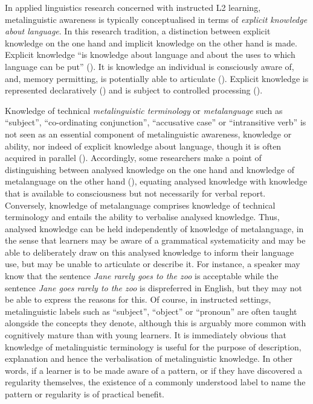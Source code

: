 \documentclass[output=paper]{langscibook}
\begin{document}
In applied linguistics research concerned with instructed L2 learning, metalinguistic awareness is typically conceptualised in terms of \textit{explicit knowledge about language}. In this research tradition, a distinction between explicit knowledge on the one hand and implicit knowledge on the other hand is made. Explicit knowledge “is knowledge about language and about the uses to which language can be put” (\citealt[229]{Ellis2004}). It is knowledge an individual is consciously aware of, and, memory permitting, is potentially able to articulate (\citealt{Ellis2004}). Explicit knowledge is represented declaratively (\citealt{Hulstijn2005}) and is subject to controlled processing (\citealt{EllisEtAl2009}).

Knowledge of technical \textit{metalinguistic terminology} or \textit{metalanguage} such as ``subject'', ``co-ordinating conjunction'', ``accusative case'' or ``intransitive verb'' is not seen as an essential component of metalinguistic awareness, knowledge or ability, nor indeed of explicit knowledge about language, though it is often acquired in parallel (\citealt{Ellis2004}). Accordingly, some researchers make a point of distinguishing between analysed knowledge on the one hand and knowledge of metalanguage on the other hand (\citealt{Gutierrez2016}), equating analysed knowledge with knowledge that is available to consciousness but not necessarily for verbal report. Conversely, knowledge of metalanguage comprises knowledge of technical terminology and entails the ability to verbalise analysed knowledge. Thus, analysed knowledge can be held independently of knowledge of metalanguage, in the sense that learners may be aware of a grammatical systematicity and may be able to deliberately draw on this analysed knowledge to inform their language use, but may be unable to articulate or describe it. For instance, a speaker may know that the sentence \textit{Jane rarely goes to the zoo} is acceptable while the sentence \textit{Jane goes rarely to the zoo} is dispreferred in English, but they may not be able to express the reasons for this. Of course, in instructed settings, metalinguistic labels such as ``subject'', ``object'' or ``pronoun'' are often taught alongside the concepts they denote, although this is arguably more common with cognitively mature than with young learners. It is immediately obvious that knowledge of metalinguistic terminology is useful for the purpose of description, explanation and hence the verbalisation of metalinguistic knowledge. In other words, if a learner is to be made aware of a pattern, or if they have discovered a regularity themselves, the existence of a commonly understood label to name the pattern or regularity is of practical benefit.
\end{document}

